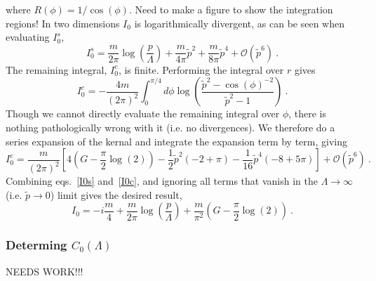 where $R(\phi)=1/\cos(\phi)$.  {\color{red}Need to make a figure to show the integration regions!}  In two dimensions $I_0$ is logarithmically divergent, as can be seen when evaluating $I_0^s$,
\begin{equation}\label{eq:I0s}
I_0^s=\frac{m}{2 \pi} \log\left(\frac{p}{\Lambda}\right)+\frac{m}{4 \pi}\tilde p^2+\frac{m}{8 \pi}\tilde p^4+\mathcal{O}(\tilde p^6)\ .
\end{equation}
The remaining integral, $I_0^c$, is finite.  Performing the integral over $r$ gives
\begin{equation}
I_0^c=-\frac{4m}{(2\pi)^2}\int_0^{\pi/4}d\phi \log\left(\frac{\tilde p^2-\cos(\phi)^{-2}}{\tilde p^2-1}\right)\ .
\end{equation}
Though we cannot directly evaluate the remaining integral over $\phi$, there is nothing pathologically wrong with it (i.e. no divergences).  We therefore do a series expansion of the kernal and integrate the expansion term by term, giving
\begin{equation}\label{eq:I0c}
I_0^c=\frac{m}{(2\pi)^2}\left[4 \left(G-\frac{\pi}{2}\log(2)\right) - \frac{1}{2} \tilde p^2 (-2 + \pi) - 
 \frac{1}{16}\tilde p^4 (-8 + 5 \pi)\right] +\mathcal{O}(\tilde p^6)\ .
\end{equation}
Combining eqs.~\eqref{I0s} and~\eqref{I0c}, and ignoring all terms that vanish in the $\Lambda\to\infty$ (i.e. $\tilde p\to 0$) limit gives the desired result,
\begin{equation}
I_0=-i \frac{m}{4}+\frac{m}{2 \pi} \log\left(\frac{p}{\Lambda}\right)+\frac{m}{\pi^2} \left(G-\frac{\pi}{2}\log(2)\right)\ .
\end{equation}

\subsubsection{Determing $C_0(\Lambda)$} 
NEEDS WORK!!!

